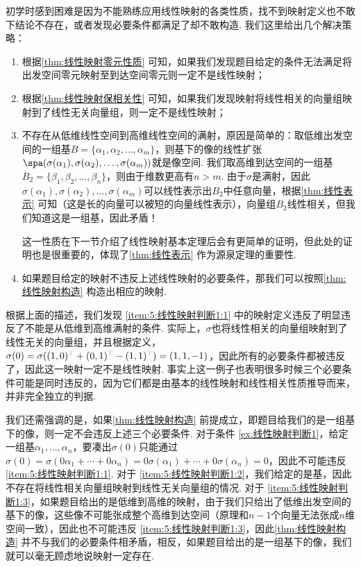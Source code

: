 初学时感到困难是因为不能熟练应用线性映射的各类性质，找不到映射定义也不敢下结论不存在，或者发现必要条件都满足了却不敢构造. 我们这里给出几个解决策略：
\begin{enumerate}
    \item \label{item:5:线性映射判断1:1}
          根据\autoref{thm:线性映射零元性质} 可知，如果我们发现题目给定的条件无法满足将出发空间零元映射至到达空间零元则一定不是线性映射；

    \item \label{item:5:线性映射判断1:2}
          根据\autoref{thm:线性映射保相关性} 可知，如果我们发现映射将线性相关的向量组映射到了线性无关向量组，则一定不是线性映射；

    \item \label{item:5:线性映射判断1:3}
          不存在从低维线性空间到高维线性空间的满射，原因是简单的：取低维出发空间的一组基$B=\{\alpha_1,\alpha_2,\ldots,\alpha_m\}$，则基下的像的线性扩张$\spa(\sigma(\alpha_1),\sigma(\alpha_2),\ldots,\sigma(\alpha_m))$就是像空间. 我们取高维到达空间的一组基$B_2=\{\beta_1,\beta_2,\ldots,\beta_n\}$，则由于维数更高有$n>m$. 由于$\sigma$是满射，因此$\sigma(\alpha_1),\sigma(\alpha_2),\ldots,\sigma(\alpha_m)$可以线性表示出$B_2$中任意向量，根据\autoref{thm:线性表示} 可知（这是长的向量可以被短的向量线性表示），向量组$B_2$线性相关，但我们知道这是一组基，因此矛盾！

          这一性质在下一节介绍了线性映射基本定理后会有更简单的证明，但此处的证明也是很重要的，体现了\autoref{thm:线性表示} 作为源泉定理的重要性.

    \item 如果题目给定的映射不违反上述线性映射的必要条件，那我们可以按照\autoref{thm:线性映射构造} 构造出相应的映射.
\end{enumerate}

根据上面的描述，我们发现 \ref*{item:5:线性映射判断1:1} 中的映射定义违反了明显违反了不能是从低维到高维满射的条件. 实际上，$\sigma$也将线性相关的向量组映射到了线性无关的向量组，并且根据定义，$\sigma(0)=\sigma((1,0)^{\color{lightgray}\mathrm{T}}+(0,1)^{\color{lightgray}\mathrm{T}}-(1,1)^{\color{lightgray}\mathrm{T}})=(1,1,-1)$，因此所有的必要条件都被违反了，因此这一映射一定不是线性映射. 事实上这一例子也表明很多时候三个必要条件可能是同时违反的，因为它们都是由基本的线性映射和线性相关性质推导而来，并非完全独立的判据.

我们还需强调的是，如果\autoref{thm:线性映射构造} 前提成立，即题目给我们的是一组基下的像，则一定不会违反上述三个必要条件. 对于条件 \ref*{ex:线性映射判断1}，给定一组基$\alpha_1,\ldots,\alpha_n$，要凑出$\sigma(0)$只能通过$\sigma(0)=\sigma(0\alpha_1+\cdots+0\alpha_n)=0\sigma(\alpha_1)+\cdots+0\sigma(\alpha_n)=0$，因此不可能违反  \ref*{item:5:线性映射判断1:1}. 对于 \ref*{item:5:线性映射判断1:2}，我们给定的是基，因此不存在将线性相关向量组映射到线性无关向量组的情况. 对于 \ref*{item:5:线性映射判断1:3}，如果题目给出的是低维到高维的映射，由于我们只给出了低维出发空间的基下的像，这些像不可能张成整个高维到达空间（原理和$n-1$个向量无法张成$n$维空间一致），因此也不可能违反 \ref*{item:5:线性映射判断1:3}，因此\autoref{thm:线性映射构造} 并不与我们的必要条件相矛盾，相反，如果题目给出的是一组基下的像，我们就可以毫无顾虑地说映射一定存在.

